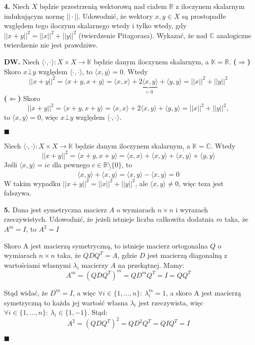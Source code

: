 \documentclass{article}
\begin{document}
\begin{center}
\large \textbf{4.}  Niech $X$ będzie przestrzenią wektorową nad ciałem $\mathds{R}$ z iloczynem skalarnym indukującym normę $||\cdot||$. Udowodnić, że wektory $x,y\in X$ są prostopadłe względem tego iloczynu skalarnego wtedy i tylko wtedy, gdy $||x+y||^2=||x||^2+||y||^2$ (twierdzenie Pitagorasa). Wykazać, że nad $\mathds{C}$ analogiczne twierdzenie nie jest prawdziwe.
\end{center}
\textbf{DW.}
Niech $\langle\cdot,\cdot\rangle:X\times X\rightarrow\mathds{K}$ będzie danym iloczynem skalarnym, a $\mathds{K}=\mathds{R}$.
\textbf{($\Rightarrow$)} Skoro $x\bot y$ względem $\langle\cdot,\cdot\rangle$, to $\langle x,y\rangle=0$. Wtedy $$||x+y||^2=\langle x+y,x+y\rangle=\langle x,x \rangle+\underbrace{2\langle x,y \rangle}_{=0}+\langle y,y \rangle=||x||^2 + ||y||^2$$
\textbf{($\Leftarrow$)} Skoro
$$||x+y||^2=\langle x+y,x+y\rangle=\langle x,x \rangle+2\langle x,y \rangle+\langle y,y \rangle=||x||^2 + ||y||^2,$$
to $\langle x,y \rangle=0$, więc $x\bot y$ względem $\langle\cdot,\cdot\rangle$.
\begin{flushright}
$\blacksquare$
\end{flushright}
Niech $\langle\cdot,\cdot\rangle:X\times X\rightarrow\mathds{K}$ będzie danym iloczynem skalarnym, a $\mathds{K}=\mathds{C}$. Wtedy 
$$||x+y||^2=\langle x+y,x+y\rangle=\langle x,x \rangle+\langle x,y \rangle+\overline{\langle x,y\rangle}+\langle y,y \rangle$$
Jeśli $\langle x,y\rangle=ic$ dla pewnego $c\in\mathds{R}\setminus\{0\}$, to $$\langle x,y\rangle+\overline{\langle x,y\rangle}=\langle x,y\rangle-\langle x,y\rangle=0$$ W takim wypadku $||x+y||^2=||x||^2+||y||^2$, ale $\langle x,y\rangle\neq0$, więc teza jest fałszywa.

\begin{center}
\large\textbf{5.} Dana jest symetryczna macierz $A$ o wymiarach $n\times n$ i wyrazach rzeczywistych. Udowodnić, że jeżeli istnieje liczba całkowita dodatnia $m$ taka, że $A^m=I$, to $A^2=I$
\end{center}

Skoro A jest macierzą symetryczną, to istnieje macierz ortogonalna $Q$ o wymiarach $n\times n$ taka, że $QDQ^T=A$, gdzie $D$ jest macierzą diagonalną z wartościami własnymi $\lambda_i$ macierzy $A$ na przekątnej. Mamy:
$$A^m=(QDQ^T)^m=QD^mQ^T=I=QQ^T$$

Stąd widać, że $D^m=I$, a więc $\forall i\in\{1,...,n\}:\ \lambda_i^m=1$, a skoro A jest macierzą symetryczną to każda jej wartość własna $\lambda_i$ jest rzeczywista, więc $\forall i\in\{1,...,n\}:\ \lambda_i\in\{1,-1\}$. Stąd: $$A^2=(QDQ^T)^2=QD^2Q^T=QIQ^T=I$$
\begin{flushright}
$\blacksquare$
\end{flushright}
\end{document}
